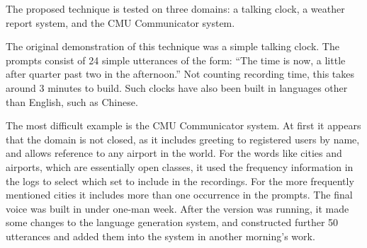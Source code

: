 The proposed technique is tested on three domains: a talking clock, a weather report system, and the CMU Communicator system.

The original demonstration of this technique was a simple talking clock. The prompts consist of 24 simple utterances of the form: ``The time is now, a little after quarter past two in the afternoon.'' Not counting recording time, this takes around 3 minutes to build. Such clocks have also been built in languages other than English, such as Chinese.

The most difficult example is the CMU Communicator system. At first it appears that the domain is not closed, as it includes greeting to registered users by name, and allows reference to any airport in the world. For the words like cities and airports, which are essentially open classes, it used the frequency information in the logs to select which set to include in the recordings. For the more frequently mentioned cities it includes more than one occurrence in the prompts. The final voice was built in under one-man week. After the version was running, it made some changes to the language generation system, and constructed further 50 utterances and added them into the system in another morning's work.
